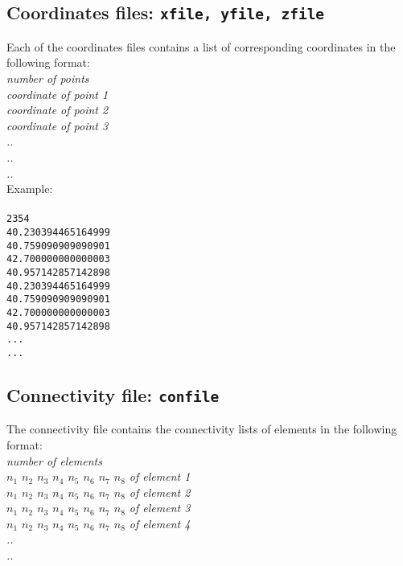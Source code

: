 \subsection{Coordinates files: \texttt{xfile, yfile, zfile}}
Each of the coordinates files contains a list of corresponding coordinates in the following format:\\

\emph{number of points \\
coordinate of point  1\\
coordinate of point  2\\
coordinate of point  3\\
..\\
..\\
..}\\

Example:\\\\
{\texttt{2354\\
40.230394465164999\\
40.759090909090901\\
42.700000000000003\\
40.957142857142898\\
40.230394465164999\\
40.759090909090901\\
42.700000000000003\\
40.957142857142898\\
...\\
...\\}}

\subsection{Connectivity file: \texttt{confile}}

The connectivity file contains the connectivity lists of elements in the following format:\\

\emph{number of elements\\
$n_1$ $n_2$ $n_3$ $n_4$ $n_5$ $n_6$ $n_7$ $n_8$ of element 1\\
$n_1$ $n_2$ $n_3$ $n_4$ $n_5$ $n_6$ $n_7$ $n_8$ of element 2\\
$n_1$ $n_2$ $n_3$ $n_4$ $n_5$ $n_6$ $n_7$ $n_8$ of element 3\\
$n_1$ $n_2$ $n_3$ $n_4$ $n_5$ $n_6$ $n_7$ $n_8$ of element 4\\
..\\
..}\\


